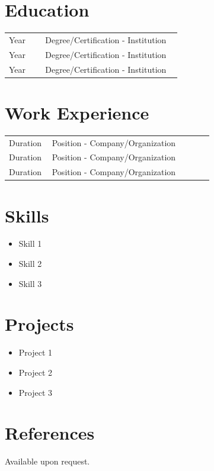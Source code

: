 \documentclass[letterpaper,10pt]{article}
\begin{document}
	\hfill
	\begin{minipage}[t]{0.65\textwidth}
		\section*{Education}
		\begin{tabular}{@{}p{0.2\linewidth} p{0.75\linewidth}}
			Year & Degree/Certification - Institution \\
			Year & Degree/Certification - Institution \\
			Year & Degree/Certification - Institution \\
		\end{tabular}
		
		\section*{Work Experience}
		\begin{tabular}{@{}p{0.2\linewidth} p{0.75\linewidth}}
			Duration & Position - Company/Organization \\
			Duration & Position - Company/Organization \\
			Duration & Position - Company/Organization \\
		\end{tabular}
		
		\section*{Skills}
		\begin{itemize}
			\item Skill 1
			\item Skill 2
			\item Skill 3
		\end{itemize}
		
		\section*{Projects}
		\begin{itemize}
			\item Project 1
			\item Project 2
			\item Project 3
		\end{itemize}
		
		\section*{References}
		Available upon request.
	\end{minipage}
	
\end{document}
